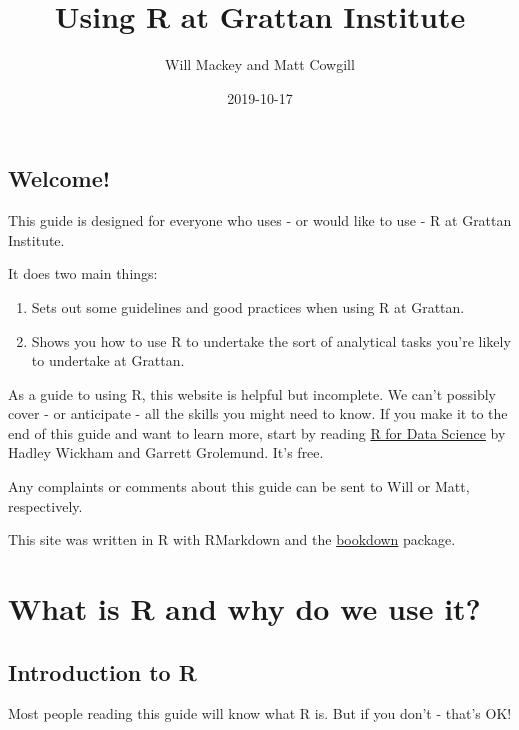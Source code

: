 \documentclass[]{book}
\title{Using R at Grattan Institute}
\author{Will Mackey and Matt Cowgill}
\date{2019-10-17}
\providecommand{\tightlist}{%
  \setlength{\itemsep}{0pt}\setlength{\parskip}{0pt}}
\begin{document}
\maketitle

{
\setcounter{tocdepth}{1}
\tableofcontents
}
\hypertarget{welcome}{%
\chapter*{Welcome!}\label{welcome}}

This guide is designed for everyone who uses - or would like to use - R at Grattan Institute.

It does two main things:

\begin{enumerate}
\def\labelenumi{\arabic{enumi}.}
\tightlist
\item
  Sets out some guidelines and good practices when using R at Grattan.
\item
  Shows you how to use R to undertake the sort of analytical tasks you're likely to undertake at Grattan.
\end{enumerate}

As a guide to using R, this website is helpful but incomplete. We can't possibly cover - or anticipate - all the skills you might need to know. If you make it to the end of this guide and want to learn more, start by reading \href{https://r4ds.had.co.nz}{R for Data Science} by Hadley Wickham and Garrett Grolemund. It's free.

Any complaints or comments about this guide can be sent to Will or Matt, respectively.

This site was written in R with RMarkdown and the \href{https://bookdown.org}{bookdown} package.

\hypertarget{part-what-is-r-and-why-do-we-use-it}{%
\part{What is R and why do we use it?}\label{part-what-is-r-and-why-do-we-use-it}}

\hypertarget{introduction-to-r}{%
\chapter{Introduction to R}\label{introduction-to-r}}

Most people reading this guide will know what R is. But if you don't - that's OK!
\end{document}
